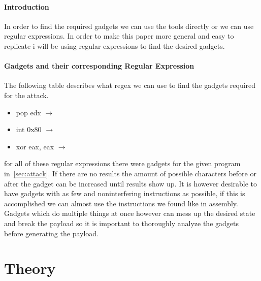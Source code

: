 \documentclass[journal=tosc,submission, notanonymous]{iacrtrans}
\begin{document}
\paragraph{Introduction}
In order to find the required gadgets we can use the tools directly or we can use regular expressions. In order to make this paper more general and easy to replicate i will be using regular expressions to find the desired gadgets.
\paragraph{Gadgets and their corresponding Regular Expression}
The following table describes what regex we can use to find the gadgets required for the attack.
\begin{itemize}
\item pop edx  $\rightarrow$ 
\item int 0x80  $\rightarrow$  
\item xor eax, eax  $\rightarrow$  
\end{itemize}
for all of these regular expressions there were gadgets for the given program in~\cref{sec:attack}. If there are no results the amount of possible characters before or after the gadget can be increased until results show up. It is however desirable to have gadgets with as few and noninterfering instructions as possible, if this is accomplished we can almost use the instructions we found like in assembly. Gadgets which do multiple things at once however can mess up the desired state and break the payload so it is important to thoroughly analyze the gadgets before generating the payload.

\section{Theory}
\end{document}
